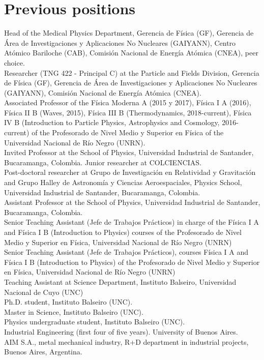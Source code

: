 \vspace{-1cm}
\ifres
\else
\ifeng
\section*{Previous positions}
\noindent
{} Head of the Medical Physics Department, Gerencia de Física (GF), Gerencia de Área de Investigaciones y Aplicaciones No Nucleares (GAIYANN), Centro Atómico Bariloche (CAB), Comisión Nacional de Energía Atómica (CNEA), peer choice.\\
 Researcher (TNG 422 - Principal C) at the Particle and Fields Division, Gerencia de Física (GF), Gerencia de Área de Investigaciones y Aplicaciones No Nucleares (GAIYANN), Comisión Nacional de Energía Atómica (CNEA).\\
 Associated Professor of the Física Moderna A (2015 y 2017), Física I A (2016), Física II B (Waves, 2015), Física III B (Thermodynamics, 2018-current), Física IV B (Introduction to Particle Physics, Astrophysics and Cosmology, 2016-current) of the Profesorado de Nivel Medio y Superior en Física of the Universidad Nacional de Río Negro (UNRN).\\
 Invited Professor at the School of Physics, Universidad Industrial de Santander, Bucaramanga, Colombia. Junior researcher at COLCIENCIAS.\\
 Post-doctoral researcher at Grupo de Investigación en Relatividad y Gravitación and Grupo Halley de Astronomía y Ciencias Aeroespaciales, Physics School, Universidad Industrial de Santander, Bucaramanga, Colombia.\\
 Assistant Professor at the School of Physics, Universidad Industrial de Santander, Bucaramanga, Colombia.\\
 Senior Teaching Assistant (Jefe de Trabajos Prácticos) in charge of the Física I A and Física I B (Introduction to Physics) courses of the Profesorado de Nivel Medio y Superior en Física, Universidad Nacional de Río Negro (UNRN)\\
 Senior Teaching Assistant (Jefe de Trabajos Prácticos), courses Física I A and Física I B (Introduction to Physics) of the Profesorado de Nivel Medio y Superior en Física, Universidad Nacional de Río Negro (UNRN)\\
 Teaching Assistant at Science Department, Instituto Balseiro, Universidad Nacional de Cuyo (UNC)\\
 Ph.D. student, Instituto Balseiro (UNC).\\
 Master in Science, Instituto Balseiro (UNC).\\
 Physics undergraduate student, Instituto Balseiro (UNC).\\
 Industrial Engineering (first four of five years). University of Buenos Aires.\\
 AIM S.A., metal mechanical industry, R+D department in industrial projects, Buenos Aires, Argentina.\\
\else
